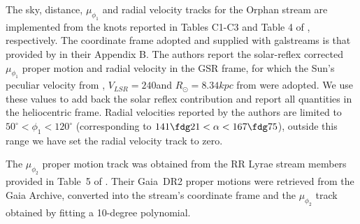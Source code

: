 The sky, distance, $\mu_{\phi_1}$ and radial velocity tracks for the Orphan stream are implemented from the knots
reported in Tables C1-C3 and Table 4 of \citet{Koposov2019}, respectively. 
The coordinate frame adopted and supplied with galstreams is that provided by \citet{Koposov2019} in their Appendix B.
The authors report the solar-reflex corrected $\mu_{\phi_1}$ proper motion and radial velocity in the GSR frame,
for which the Sun's peculiar velocity from \citet{Schoenrich2010}, $V_{LSR}=240$\kms and $R_\odot=8.34kpc$ 
from \citet{Reid2014} were adopted. We use these values to add back the solar reflex contribution and report all quantities in the heliocentric frame. Radial velocities reported by the authors are limited to $50^\circ<\phi_1<120^\circ$ (corresponding to 
$141\fdg21<\alpha<167\fdg75$), outside this range we have set the radial velocity track to zero.

The $\mu_{\phi_2}$ proper motion track was obtained from the RR Lyrae stream members provided in Table~5 of \citet{Koposov2019}. Their Gaia~DR2 \citep{GaiaCol_2018_DR2_survey} proper motions were retrieved from the Gaia Archive, converted into the stream's coordinate frame and the 
$\mu_{\phi_2}$ track obtained by fitting a 10-degree polynomial. 
